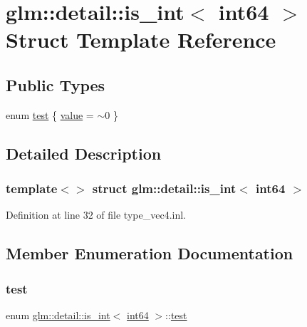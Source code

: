 \hypertarget{structglm_1_1detail_1_1is__int_3_01int64_01_4}{}\section{glm\+::detail\+::is\+\_\+int$<$ int64 $>$ Struct Template Reference}
\label{structglm_1_1detail_1_1is__int_3_01int64_01_4}
\subsection*{Public Types}
\begin{DoxyCompactItemize}
\item 
enum \mbox{\hyperlink{structglm_1_1detail_1_1is__int_3_01int64_01_4_a6d738b326fc92804b0cffae571ac3e7f}{test}} \{ \mbox{\hyperlink{structglm_1_1detail_1_1is__int_3_01int64_01_4_a6d738b326fc92804b0cffae571ac3e7fa143df02d7060f75928a631355c601c08}{value}} = $\sim$0
 \}
\end{DoxyCompactItemize}


\subsection{Detailed Description}
\subsubsection*{template$<$$>$\newline
struct glm\+::detail\+::is\+\_\+int$<$ int64 $>$}



Definition at line 32 of file type\+\_\+vec4.\+inl.



\subsection{Member Enumeration Documentation}
\mbox{\label{structglm_1_1detail_1_1is__int_3_01int64_01_4_a6d738b326fc92804b0cffae571ac3e7f}} 
\subsubsection{\texorpdfstring{test}{test}}
{\footnotesize\ttfamily enum \mbox{\hyperlink{structglm_1_1detail_1_1is__int}{glm\+::detail\+::is\+\_\+int}}$<$ \mbox{\hyperlink{namespaceglm_1_1detail_a5b1c3227ec636c24a0676746381adfc8}{int64}} $>$\+::\mbox{\hyperlink{structglm_1_1detail_1_1is__int_3_01int64_01_4_a6d738b326fc92804b0cffae571ac3e7f}{test}}}

